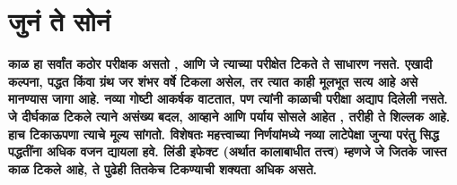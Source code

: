 \chapter{जुनं ते सोनं}

\textcolor{blue!60!black}{\textbf{काळ हा सर्वांत कठोर परीक्षक असतो , आणि जे त्याच्या परीक्षेत टिकते ते साधारण नसते. एखादी कल्पना, पद्धत किंवा ग्रंथ जर शंभर वर्षे टिकला असेल, तर त्यात काही मूलभूत सत्य आहे असे मानण्यास जागा आहे. नव्या गोष्टी आकर्षक वाटतात, पण त्यांनी काळाची परीक्षा अद्याप दिलेली नसते. जे दीर्घकाळ टिकले त्याने असंख्य बदल, आव्हाने आणि पर्याय सोसले आहेत , तरीही ते शिल्लक आहे. हाच टिकाऊपणा त्याचे मूल्य सांगतो. विशेषतः महत्त्वाच्या निर्णयांमध्ये नव्या लाटेपेक्षा जुन्या परंतु सिद्ध पद्धतींना अधिक वजन द्यायला हवे. लिंडी इफेक्ट (अर्थात कालाबाधीत तत्त्व) म्हणजे जे जितके जास्त काळ टिकले आहे, ते पुढेही तितकेच टिकण्याची शक्यता अधिक असते.}}

